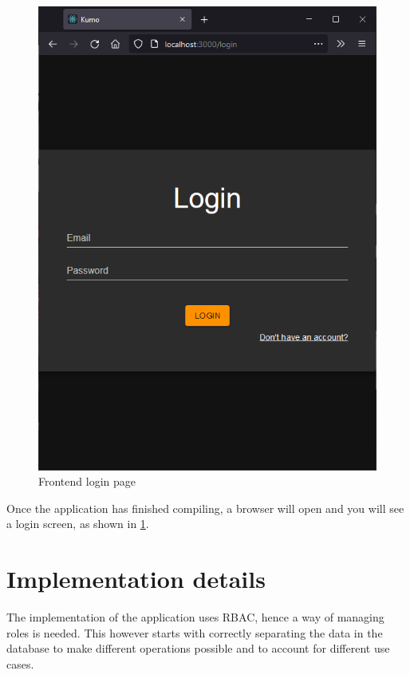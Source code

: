 \begin{figure}[htbp]
	\centering
		\includegraphics[scale=0.5]{./figures/chapter4/frontend_login.png}
	\caption{Frontend login page}
	\label{FigFrontendLogin}
\end{figure}

Once the application has finished compiling, a browser will open and you will see a login screen, as shown in \ref{FigFrontendLogin}.


\section{Implementation details}
The implementation of the application uses RBAC, hence a way of managing roles is needed. This however starts with correctly separating the data in the database to make different operations possible and to account for different use cases.

